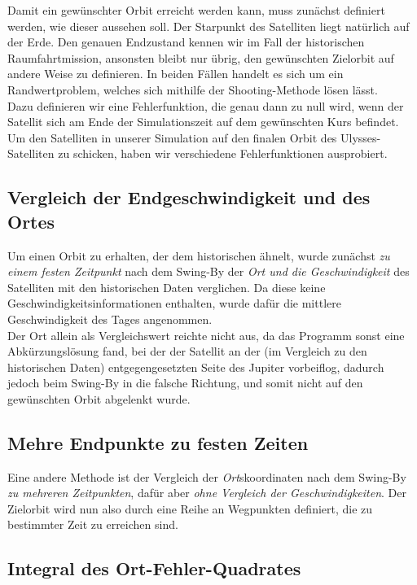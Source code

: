 Damit ein gewünschter Orbit erreicht werden kann, muss zunächst definiert werden, wie dieser aussehen soll. Der Starpunkt des Satelliten liegt natürlich auf der Erde. Den genauen Endzustand kennen wir im Fall der historischen Raumfahrtmission, ansonsten bleibt nur übrig, den gewünschten Zielorbit auf andere Weise zu definieren. In beiden Fällen handelt es sich um ein Randwertproblem, welches sich mithilfe der Shooting-Methode lösen lässt.\\
Dazu definieren wir eine Fehlerfunktion, die genau dann zu null wird, wenn der Satellit sich am Ende der Simulationszeit auf dem gewünschten Kurs befindet.
Um den Satelliten in unserer Simulation auf den finalen Orbit des Ulysses-Satelliten zu schicken, haben wir verschiedene Fehlerfunktionen ausprobiert.


\subsection{Vergleich der Endgeschwindigkeit und des Ortes}

Um einen Orbit zu erhalten, der dem historischen ähnelt, wurde zunächst \textit{zu einem festen Zeitpunkt} nach dem Swing-By der \textit{Ort und die Geschwindigkeit} des Satelliten mit den historischen Daten verglichen. Da diese keine Geschwindigkeitsinformationen enthalten, wurde dafür die mittlere Geschwindigkeit des Tages angenommen. \\
Der Ort allein als Vergleichswert reichte nicht aus, da das Programm sonst eine Abkürzungslösung fand, bei der der Satellit an der (im Vergleich zu den historischen Daten) entgegengesetzten Seite des Jupiter vorbeiflog, dadurch jedoch beim Swing-By in die falsche Richtung, und somit nicht auf den gewünschten Orbit abgelenkt wurde.

\subsection{Mehre Endpunkte zu festen Zeiten}

Eine andere Methode ist der Vergleich der \textit{Ort}skoordinaten nach dem Swing-By \textit{zu mehreren Zeitpunkten}, dafür aber \textit{ohne Vergleich der Geschwindigkeiten}. Der Zielorbit wird nun also durch eine Reihe an Wegpunkten definiert, die zu bestimmter Zeit zu erreichen sind.

\subsection{Integral des Ort-Fehler-Quadrates}

